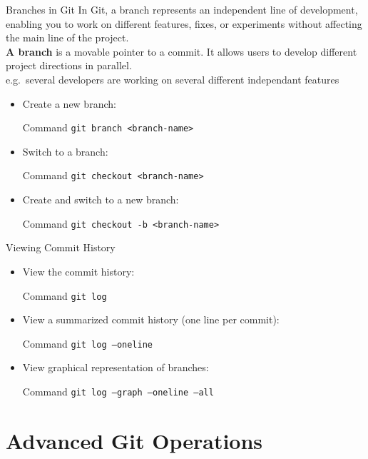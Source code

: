 \documentclass{beamer}
\begin{document}
\begin{frame}{Branches in Git}
  \footnotesize
  In Git, a branch represents an independent line of development, enabling you to work on different features, fixes, or experiments without affecting the main line of the project.\\
  \textbf{A branch} is a movable pointer to a commit. It allows users to develop different project directions in parallel.\\
  e.g.\ several developers are working on several different independant features
  \begin{itemize}
      \item Create a new branch:
      \begin{block}{Command}
        \texttt{git branch <branch-name>}
      \end{block}
      \item Switch to a branch:
      \begin{block}{Command}
        \texttt{git checkout <branch-name>}
      \end{block}
      \item Create and switch to a new branch:
      \begin{block}{Command}
        \texttt{git checkout -b <branch-name>}
      \end{block}
  \end{itemize}
\end{frame}

\begin{frame}{Viewing Commit History}
  \begin{itemize}
    \item View the commit history:
    \begin{block}{Command}
      \texttt{git log}
    \end{block}
    \item View a summarized commit history (one line per commit):
    \begin{block}{Command}
      \texttt{git log --oneline}
    \end{block}
    \item View graphical representation of branches:
    \begin{block}{Command}
      \texttt{git log --graph --oneline --all}
    \end{block}
  \end{itemize}
\end{frame}

\section{Advanced Git Operations}
\end{document}
